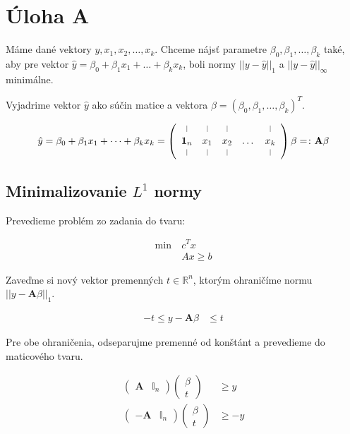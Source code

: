 \documentclass[report.tex]{subfiles}
\begin{document}
\section{Úloha A}\label{sec:A}

Máme dané vektory $y, x_1, x_2, \dots, x_k$. Chceme nájsť parametre $\beta_0, \beta_1,\dots,\beta_k$ také, aby pre vektor $\hat{y} = \beta_0 + \beta_1x_1 + \dots + \beta_kx_k$, boli normy $||y - \hat{y}||_1$ a $||y - \hat{y}||_{\infty}$ minimálne. 

Vyjadrime vektor $\hat{y}$ ako súčin matice a vektora $\beta = (\beta_0, \beta_1, \dots, \beta_k)^T$.

\begin{align*}
	\hat{y} = \beta_0 + \beta_1x_1 + \dots + \beta_kx_k = 
	\left(
		\begin{array}{ccccc}
			\vertbar & \vertbar & \vertbar &  & \vertbar \\
			\mathbf{1}_n & x_1 & x_2 & \dots & x_k \\
			\vertbar & \vertbar & \vertbar &  & \vertbar
		\end{array}
	\right)
	\beta
	=\colon
	\mathbf{A} \beta
\end{align*}

\subsection{Minimalizovanie $L^1$ normy}

Prevedieme problém zo zadania do tvaru:

\begin{align*}
	\text{min}~ &c^Tx\\
	&Ax \geq b
\end{align*}

Zaveďme si nový vektor premenných $t \in \mathbb{R}^n$, ktorým ohraničíme normu $||y - \mathbf{A} \beta||_1$.

\begin{align*}
	-t \leq y - \mathbf{A} \beta &\leq t
\end{align*}	

Pre obe ohraničenia, odseparujme premenné od konštánt a prevedieme do maticového tvaru.

\begin{align*}
	\left(
		\begin{array}{c|c}
			\mathbf{A} & \mathbb{I}_n
		\end{array}
	\right)
	\left(
		\begin{array}{c}
			\beta \\
			\hline
			t
		\end{array}
	\right) &\geq y \\
	\left(
		\begin{array}{c|c}
			-\mathbf{A} & \mathbb{I}_n
		\end{array}
	\right)
	\left(
		\begin{array}{c}
			\beta \\
			\hline
			t
		\end{array}
	\right) &\geq -y
\end{align*}
\end{document}
